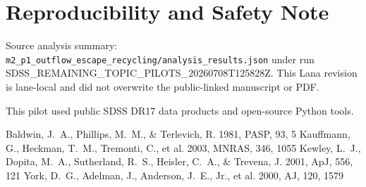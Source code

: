 \documentclass[twocolumn]{aastex631}
\begin{document}
\section*{Reproducibility and Safety Note}
Source analysis summary: \texttt{m2\_p1\_outflow\_escape\_recycling/analysis\_results.json} under run SDSS\_REMAINING\_TOPIC\_PILOTS\_20260708T125828Z.  This Lana revision is lane-local and did not overwrite the public-linked manuscript or PDF.

\acknowledgments
This pilot used public SDSS DR17 data products and open-source Python tools.

\begin{thebibliography}{}
 Baldwin, J.~A., Phillips, M.~M., \& Terlevich, R. 1981, PASP, 93, 5
 Kauffmann, G., Heckman, T.~M., Tremonti, C., et al. 2003, MNRAS, 346, 1055
 Kewley, L.~J., Dopita, M.~A., Sutherland, R.~S., Heisler, C.~A., \& Trevena, J. 2001, ApJ, 556, 121
 York, D.~G., Adelman, J., Anderson, J.~E., Jr., et al. 2000, AJ, 120, 1579
\end{thebibliography}
\end{document}
